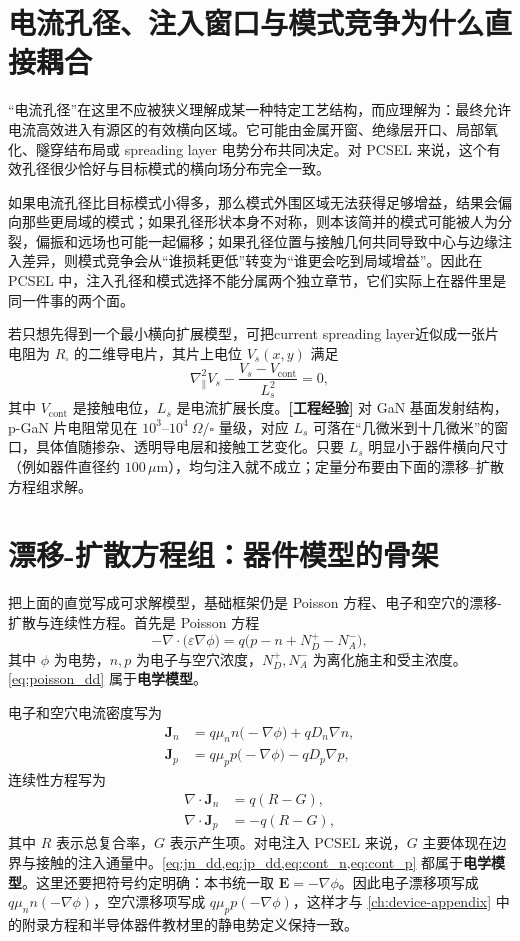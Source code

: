 \section{电流孔径、注入窗口与模式竞争为什么直接耦合}
“电流孔径”在这里不应被狭义理解成某一种特定工艺结构，而应理解为：最终允许电流高效进入有源区的有效横向区域。它可能由金属开窗、绝缘层开口、局部氧化、隧穿结布局或 spreading layer 电势分布共同决定。对 PCSEL 来说，这个有效孔径很少恰好与目标模式的横向场分布完全一致。

如果电流孔径比目标模式小得多，那么模式外围区域无法获得足够增益，结果会偏向那些更局域的模式；如果孔径形状本身不对称，则本该简并的模式可能被人为分裂，偏振和远场也可能一起偏移；如果孔径位置与接触几何共同导致中心与边缘注入差异，则模式竞争会从“谁损耗更低”转变为“谁更会吃到局域增益”。因此在 PCSEL 中，注入孔径和模式选择不能分属两个独立章节，它们实际上在器件里是同一件事的两个面。

若只想先得到一个最小横向扩展模型，可把current spreading layer近似成一张片电阻为 $R_{\square}$ 的二维导电片，其片上电位 $V_s(x,y)$ 满足
\begin{equation}
\nabla_\parallel^2 V_s-\frac{V_s-V_{\mathrm{cont}}}{L_s^2}=0,
\label{eq:current_spreading_sheet}
\end{equation}
其中 $V_{\mathrm{cont}}$ 是接触电位，$L_s$ 是电流扩展长度。\textbf{[工程经验]} 对 GaN 基面发射结构，p-GaN 片电阻常见在 $10^3$--$10^4~\Omega/\square$ 量级，对应 $L_s$ 可落在“几微米到十几微米”的窗口，具体值随掺杂、透明导电层和接触工艺变化。只要 $L_s$ 明显小于器件横向尺寸（例如器件直径约 $100\,\mu\mathrm{m}$），均匀注入就不成立；定量分布要由下面的漂移--扩散方程组求解。

\section{漂移-扩散方程组：器件模型的骨架}
把上面的直觉写成可求解模型，基础框架仍是 Poisson 方程、电子和空穴的漂移-扩散与连续性方程。首先是 Poisson 方程
\begin{equation}
-\nabla\cdot\big(\varepsilon \nabla \phi\big)
=
q\big(p-n+N_D^+-N_A^-\big),
\label{eq:poisson_dd}
\end{equation}
其中 $\phi$ 为电势，$n,p$ 为电子与空穴浓度，$N_D^+,N_A^-$ 为离化施主和受主浓度。\cref{eq:poisson_dd} 属于\textbf{电学模型}。

电子和空穴电流密度写为
\begin{align}
\bm{J}_n &= q\mu_n n\bigl(-\nabla \phi\bigr) + qD_n\nabla n,
\label{eq:jn_dd}\\
\bm{J}_p &= q\mu_p p\bigl(-\nabla \phi\bigr) - qD_p\nabla p,
\label{eq:jp_dd}
\end{align}
连续性方程写为
\begin{align}
\nabla\cdot\bm{J}_n &= q(R-G),
\label{eq:cont_n}\\
\nabla\cdot\bm{J}_p &= -q(R-G),
\label{eq:cont_p}
\end{align}
其中 $R$ 表示总复合率，$G$ 表示产生项。对电注入 PCSEL 来说，$G$ 主要体现在边界与接触的注入通量中。\cref{eq:jn_dd,eq:jp_dd,eq:cont_n,eq:cont_p} 都属于\textbf{电学模型}。这里还要把符号约定明确：本书统一取 $\bm E=-\nabla\phi$。因此电子漂移项写成 $q\mu_n n(-\nabla\phi)$，空穴漂移项写成 $q\mu_p p(-\nabla\phi)$，这样才与 \cref{ch:device-appendix} 中的附录方程和半导体器件教材里的静电势定义保持一致。


